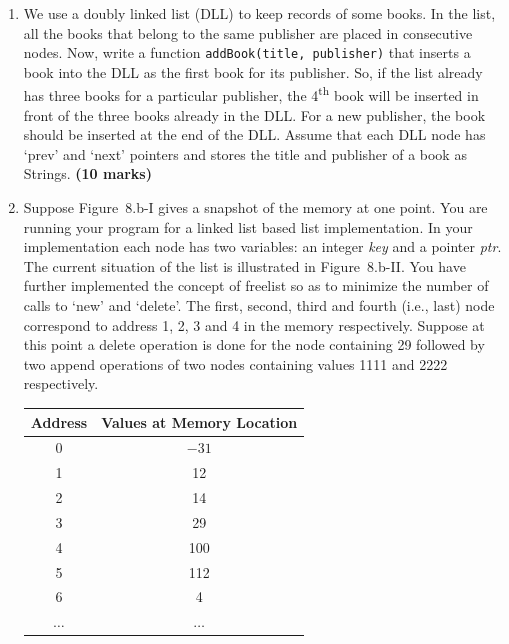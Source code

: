 \documentclass[12pt,a3paper]{article}
\newcommand{\mk}[1]{\textcolor{orange!70!black}{\small\textbf{(#1 marks)}}}
\begin{document}
\begin{enumerate}

\item We use a doubly linked list (DLL) to keep records of some books. In the list,
all the books that belong to the same publisher are placed in consecutive nodes.
Now, write a function \texttt{addBook(title, publisher)} that inserts a book into
the DLL as the first book for its publisher. So, if the list already has three books
for a particular publisher, the 4\textsuperscript{th} book will be inserted in
front of the three books already in the DLL. For a new publisher, the book should
be inserted at the end of the DLL. Assume that each DLL node has `prev' and `next'
pointers and stores the title and publisher of a book as Strings. \mk{10}

\item Suppose Figure~8.b-I gives a snapshot of the memory at one point. You are
running your program for a linked list based list implementation. In your
implementation each node has two variables: an integer \textit{key} and a pointer
\textit{ptr}. The current situation of the list is illustrated in Figure~8.b-II. You
have further implemented the concept of freelist so as to minimize the number of
calls to `new' and `delete'. The first, second, third and fourth (i.e., last) node
correspond to address 1, 2, 3 and 4 in the memory respectively. Suppose at this
point a delete operation is done for the node containing 29 followed by two append
operations of two nodes containing values 1111 and 2222 respectively.

\begin{center}
\begin{tabular}{@{}|c|c|@{}}
\hline
\textbf{Address} & \textbf{Values at Memory Location} \\
\hline
0  & $-31$ \\
1  & 12 \\
2  & 14 \\
3  & 29 \\
4  & 100 \\
5  & 112 \\
6  & 4 \\
$\ldots$ & $\ldots$ \\
\hline
\end{tabular}
\end{center}


\end{enumerate}
\end{document}
